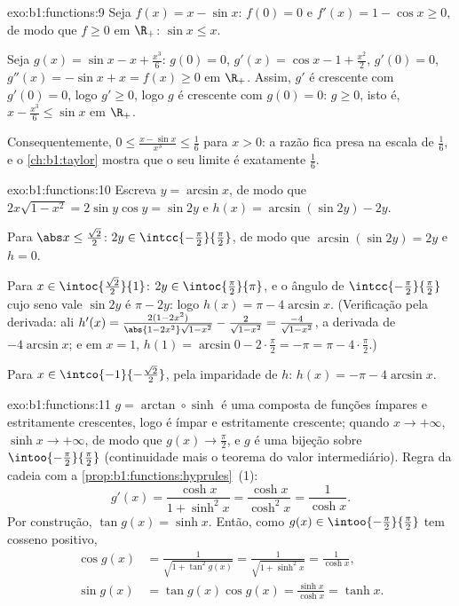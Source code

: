 \begin{solution}{exo:b1:functions:9}
Seja $f(x) = x - \sin x$: $f(0) = 0$ e $f'(x) = 1 - \cos x \geq 0$,
de modo que $f \geq 0$ em $\R_+$: $\sin x \leq x$.

Seja $g(x) = \sin x - x + \frac{x^3}{6}$: $g(0) = 0$, $g'(x) = \cos x -
1 + \frac{x^2}{2}$, $g'(0) = 0$, $g''(x) = -\sin x + x = f(x) \geq 0$
em $\R_+$. Assim, $g'$ é crescente com $g'(0) = 0$, logo $g' \geq 0$,
logo $g$ é crescente com $g(0) = 0$: $g \geq 0$, isto é, $x -
\frac{x^3}{6} \leq \sin x$ em $\R_+$.

Consequentemente, $0 \leq \frac{x - \sin x}{x^3} \leq \frac 16$ para $x >
0$: a razão fica presa na escala de $\frac16$, e o
\cref{ch:b1:taylor} mostra que o seu limite é exatamente $\frac 16$.
\end{solution}

\begin{solution}{exo:b1:functions:10}
Escreva $y = \arcsin x$, de modo que $2x\sqrt{1 - x^2} = 2\sin y\cos y = \sin
2y$ e $h(x) = \arcsin(\sin 2y) - 2y$.

Para $\abs x \leq \frac{\sqrt 2}{2}$: $2y \in
\intcc{-\frac\pi2}{\frac\pi2}$, de modo que $\arcsin(\sin 2y) = 2y$ e $h =
0$.

Para $x \in \intoc{\frac{\sqrt 2}{2}}{1}$: $2y \in
\intoc{\frac\pi2}{\pi}$, e o ângulo de
$\intcc{-\frac\pi2}{\frac\pi2}$ cujo seno vale $\sin 2y$ é $\pi - 2y$:
logo $h(x) = \pi - 4\arcsin x$. (Verificação pela derivada: ali
$h'(x) = \frac{2(1 - 2x^2)}{\abs{1 - 2x^2}\sqrt{1 - x^2}} -
\frac{2}{\sqrt{1-x^2}} = \frac{-4}{\sqrt{1 - x^2}}$, a derivada
de $-4\arcsin x$; e em $x = 1$, $h(1) = \arcsin 0 - 2\cdot\frac\pi2
= -\pi = \pi - 4\cdot\frac\pi2$.)

Para $x \in \intco{-1}{-\frac{\sqrt 2}{2}}$, pela imparidade de $h$:
$h(x) = -\pi - 4\arcsin x$.
\end{solution}

\begin{solution}{exo:b1:functions:11}
$g = \arctan \circ \sinh$ é uma composta de funções ímpares e estritamente
crescentes, logo é ímpar e estritamente crescente; quando $x \to
+\infty$, $\sinh x \to +\infty$, de modo que $g(x) \to \frac\pi2$, e $g$ é uma
bijeção sobre $\intoo{-\frac\pi2}{\frac\pi2}$ (continuidade mais o
teorema do valor intermediário). Regra da cadeia com a
\cref{prop:b1:functions:hyprules}~(1):
\[
g'(x) = \frac{\cosh x}{1 + \sinh^2 x} = \frac{\cosh x}{\cosh^2 x}
= \frac{1}{\cosh x} .
\]
Por construção, $\tan g(x) = \sinh x$. Então, como $g(x) \in
\intoo{-\frac\pi2}{\frac\pi2}$ tem cosseno positivo,
\begin{align*}
\cos g(x) &= \frac{1}{\sqrt{1 + \tan^2 g(x)}}
= \frac{1}{\sqrt{1 + \sinh^2 x}} = \frac{1}{\cosh x},\\
\sin g(x) &= \tan g(x) \cos g(x) = \frac{\sinh x}{\cosh x} = \tanh x .
\end{align*}
\end{solution}

